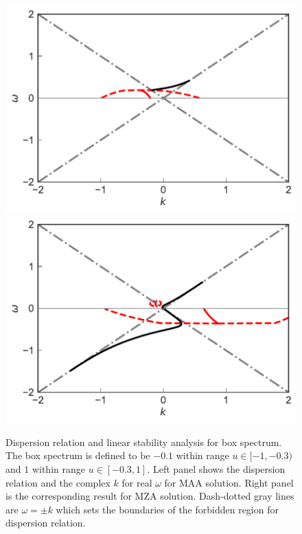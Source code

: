 \begin{figure}
   \includegraphics[width=\linewidth]{chapters/assets/dr/spectBoxC1MAADRPltBlob.pdf}
   \endminipage\hfill
   \includegraphics[width=\linewidth]{chapters/assets/dr/spectBoxC1MZADRPltBlob.pdf}
   \endminipage\hfill
   \caption{Dispersion relation and linear stability analysis for box spectrum. The box spectrum is defined to be $-0.1$ within range $u\in [-1,-0.3)$ and $1$ within range $u\in [-0.3,1]$. Left panel shows the dispersion relation and the complex $k$ for real $\omega$ for MAA solution. Right panel is the corresponding result for MZA solution. Dash-dotted gray lines are $\omega= \pm k$ which sets the boundaries of the forbidden region for dispersion relation.
    }
   \label{fig-box-c1}
\end{figure}



